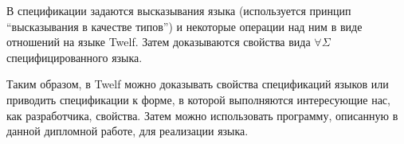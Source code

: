 В спецификации задаются высказывания языка (используется принцип ``высказывания в качестве типов''\cite{harper:1993}) и некоторые операции над ним в виде отношений на языке Twelf. Затем доказываются свойства вида  $\forall\Sigma$ специфицированного языка.

Таким образом, в Twelf можно доказывать свойства спецификаций языков или приводить спецификации к форме, в которой выполняются интересующие нас, как разработчика, свойства. Затем можно использовать программу, описанную в данной дипломной работе, для реализации языка.






